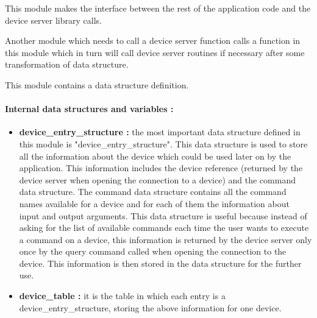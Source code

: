 %
%
%
%
%
%
%
%
%
%
This module makes the interface between the rest of the application code
and the device server library calls.

Another module which needs to call a device server function calls a function
in this module which in turn will call device server routines if necessary after
some transformation of data structure.

This module contains a data structure definition.

\paragraph{Internal data structures and variables : }

\begin{itemize}
\item
{\bf device\_entry\_structure : } the most important data structure defined in
this module is "device\_entry\_structure". This data structure is used to store
all the information about the device which could be used later on by the
application. This information includes the device reference (returned by
the device server when opening the connection to a device) and the command
data structure. The command data structure contains all the command names
available for a device and for each of them the information about input and
output arguments.
This data structure is useful because instead of asking for the list of
available commands each time the user wants to execute a command on a device,
this information is returned by the device server only once by the query command
called when opening the connection to the device. This information is then
stored in the data structure for the further use.
\item
{\bf device\_table : } it is the table in which each entry is a
device\_entry\_structure, storing the above information for one device.
\end{itemize}

